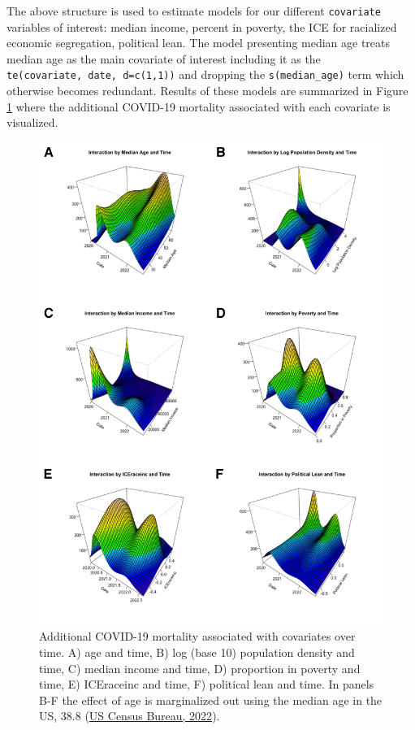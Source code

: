 \documentclass[
]{article}
\begin{document}
The above structure is used to estimate models for our different \texttt{covariate}
variables of interest: median income, percent in poverty, the ICE for racialized
economic segregation, political lean. The model presenting median age treats
median age as the main covariate of interest including it as the \texttt{te(covariate,\ date,\ d=c(1,1))} and dropping the \texttt{s(median\_age)} term which otherwise becomes redundant.
Results of these models are summarized in Figure
\ref{fig:one-variable-over-time} where the additional COVID-19 mortality
associated with each covariate is visualized.



\begin{figure}

{\centering \includegraphics[width=1\linewidth,height=0.75\textheight]{figures/nonspatial_panel_figure} 

}

\caption{Additional COVID-19 mortality associated with covariates over time. A) age and time, B) log (base 10) population density and time, C) median income and time, D) proportion in poverty and time, E) ICEraceinc and time, F) political lean and time. In panels B-F the effect of age is marginalized out using the median age in the US, 38.8 (\protect\hyperlink{ref-us_census_bureau_nation_2022}{US Census Bureau, 2022}).}\label{fig:one-variable-over-time}
\end{figure}
\end{document}
